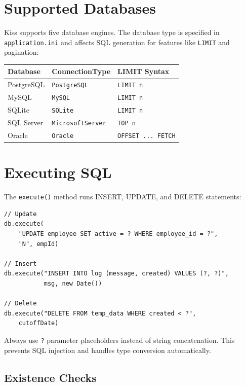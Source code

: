 \section{Supported Databases}
\label{sec:db-databases}

Kiss supports five database engines.  The database type is specified in \texttt{application.ini} and affects SQL generation for features like \texttt{LIMIT} and pagination:

\begin{longtable}{lll}
\toprule
\textbf{Database} & \textbf{ConnectionType} & \textbf{LIMIT Syntax} \\
\midrule
\endhead
PostgreSQL & \texttt{PostgreSQL} & \texttt{LIMIT n} \\
MySQL & \texttt{MySQL} & \texttt{LIMIT n} \\
SQLite & \texttt{SQLite} & \texttt{LIMIT n} \\
SQL Server & \texttt{MicrosoftServer} & \texttt{TOP n} \\
Oracle & \texttt{Oracle} & \texttt{OFFSET ... FETCH} \\
\bottomrule
\end{longtable}

\section{Executing SQL}
\label{sec:db-execute}

The \texttt{execute()} method runs INSERT, UPDATE, and DELETE statements:

\begin{lstlisting}[style=groovy]
// Update
db.execute(
    "UPDATE employee SET active = ? WHERE employee_id = ?",
    "N", empId)

// Insert
db.execute("INSERT INTO log (message, created) VALUES (?, ?)",
           msg, new Date())

// Delete
db.execute("DELETE FROM temp_data WHERE created < ?",
    cutoffDate)
\end{lstlisting}

\begin{warnbox}
Always use \texttt{?} parameter placeholders instead of string concatenation.  This prevents SQL injection and handles type conversion automatically.
\end{warnbox}

\subsection{Existence Checks}

